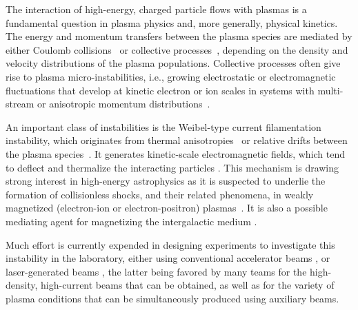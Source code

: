 \documentclass[aps,showpacs,superscriptaddress]{revtex4}
\begin{document}
The interaction of high-energy, charged particle flows with plasmas is a fundamental question in plasma physics and, more generally, physical kinetics. The energy and momentum transfers between the plasma species are mediated by either Coulomb collisions~\cite{Shkarofsky_1966} or collective processes~\cite{Belmont_2013}, depending on the density and velocity distributions of the plasma populations. Collective processes often give rise to plasma micro-instabilities, i.e., growing electrostatic or electromagnetic fluctuations that develop at kinetic electron or ion scales in systems with multi-stream or anisotropic momentum distributions~\cite{Davidson_1983}. 

An important class of instabilities is the Weibel-type current filamentation instability, which originates from thermal anisotropies~\cite{PRL_Weibel_1959} or relative drifts between the plasma species~\cite{POF_Fried_1959}. It generates kinetic-scale electromagnetic fields, which tend to deflect and thermalize the interacting particles \cite{POF_Davidson_1972, PRL_Lee_1973, PRL_Adam_2006}. This mechanism is drawing strong interest in high-energy astrophysics as it is suspected to underlie the formation of collisionless shocks, and their related phenomena, in weakly magnetized (electron-ion or electron-positron) plasmas~\cite{RPP_Marcowith_2016}. It is also a possible mediating agent for magnetizing the intergalactic medium \cite{APJ_Schlickeiser_2003}.

Much effort is currently expended in designing experiments to investigate this instability in the laboratory, either using conventional accelerator beams \cite{PRL_Allen_2012}, or laser-generated beams \cite{PRL_Fox_2013, NP_Huntington_2015}, the latter being favored by many teams for the high-density, high-current beams that can be obtained, as well as for the variety of plasma conditions that can be simultaneously produced using auxiliary beams. 
\end{document}
